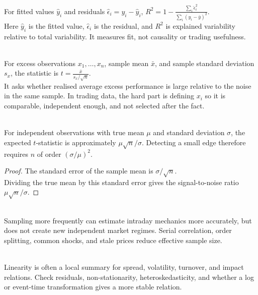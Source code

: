 \begin{definition} \\
For fitted values $\hat{y}_i$ and residuals $\hat{\epsilon}_i=y_i-\hat{y}_i$, $R^2=1-\frac{\sum\limits_i\hat{\epsilon}_i^2}{\sum\limits_i(y_i-\bar{y})^2}$.\\
Here $\hat{y}_i$ is the fitted value, $\hat{\epsilon}_i$ is the residual, and $R^2$ is explained variability relative to total variability. It measures fit, not causality or trading usefulness.
\end{definition}

\begin{model} \\
For excess observations $x_1,\ldots,x_n$, sample mean $\bar{x}$, and sample standard deviation $s_x$, the statistic is $t=\frac{\bar{x}}{s_x/\sqrt{n}}$.\\
It asks whether realised average excess performance is large relative to the noise in the same sample. In trading data, the hard part is defining $x_i$ so it is comparable, independent enough, and not selected after the fact.
\end{model}

\begin{proposition} \\
For independent observations with true mean $\mu$ and standard deviation $\sigma$, the expected $t$-statistic is approximately $\mu\sqrt{n}/\sigma$. Detecting a small edge therefore requires $n$ of order $(\sigma/\mu)^2$.
\begin{proof}
The standard error of the sample mean is $\sigma/\sqrt{n}$.\\
Dividing the true mean by this standard error gives the signal-to-noise ratio $\mu\sqrt{n}/\sigma$.
\end{proof}
\end{proposition}

\begin{caveat} \\
Sampling more frequently can estimate intraday mechanics more accurately, but does not create new independent market regimes. Serial correlation, order splitting, common shocks, and stale prices reduce effective sample size.
\end{caveat}

\begin{caveat} \\
Linearity is often a local summary for spread, volatility, turnover, and impact relations. Check residuals, non-stationarity, heteroskedasticity, and whether a log or event-time transformation gives a more stable relation.
\end{caveat}

